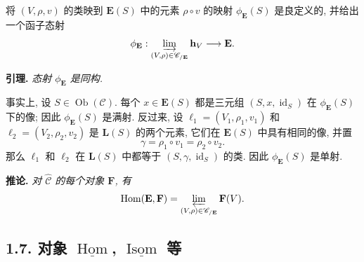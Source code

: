 将 \((V,\rho,v)\) 的类映到 \(\mathbf E(S)\) 中的元素
\(\rho\circ v\) 的映射 \(\phi_{\mathbf E}(S)\) 是良定义的,
并给出一个函子态射
\[
  \phi_{\mathbf E}:
  \varinjlim_{(V,\rho)\in\mathscr C_{/\mathbf E}}\mathbf h_V
    \longrightarrow\mathbf E.
\]

\medskip
\noindent\textbf{引理.}
\textit{态射 \(\phi_{\mathbf E}\) 是同构.}

事实上, 设 \(S\in\operatorname{Ob}(\mathscr C)\). 每个
\(x\in\mathbf E(S)\) 都是三元组 \((S,x,\operatorname{id}_S)\)
在 \(\phi_{\mathbf E}(S)\) 下的像; 因此 \(\phi_{\mathbf E}(S)\) 是满射.
反过来, 设
\(\ell_1=(V_1,\rho_1,v_1)\) 和
\(\ell_2=(V_2,\rho_2,v_2)\) 是 \(\mathbf L(S)\) 的两个元素,
它们在 \(\mathbf E(S)\) 中具有相同的像, 并置
\[
  \gamma=\rho_1\circ v_1=\rho_2\circ v_2.
\]
那么 \(\ell_1\) 和 \(\ell_2\) 在 \(\mathbf L(S)\) 中都等于
\((S,\gamma,\operatorname{id}_S)\) 的类. 因此
\(\phi_{\mathbf E}(S)\) 是单射.

\medskip
\noindent\textbf{推论.}
\textit{对 \(\widehat{\mathscr C}\) 的每个对象 \(\mathbf F\), 有
\[
  \operatorname{Hom}(\mathbf E,\mathbf F)
    =\varprojlim_{(V,\rho)\in\mathscr C_{/\mathbf E}}\mathbf F(V).
\]}

\subsection*{1.7. 对象 \(\underline{\operatorname{Hom}}\),
\(\underline{\operatorname{Isom}}\) 等}


